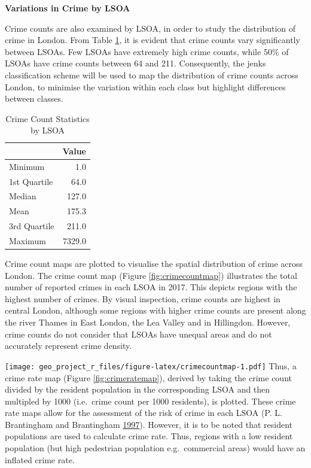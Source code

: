\documentclass[]{article}
\begin{document}
\textbf{Variations in Crime by LSOA}

Crime counts are also examined by LSOA, in order to study the
distribution of crime in London. From Table \ref{tab:LSOAstats}, it is
evident that crime counts vary significantly between LSOAs. Few LSOAs
have extremely high crime counts, while 50\% of LSOAs have crime counts
between 64 and 211. Consequently, the jenks classification scheme will
be used to map the distribution of crime counts across London, to
minimise the variation within each class but highlight differences
between classes.

\begin{table}

\caption{\label{tab:LSOAstats}Crime Count Statistics by LSOA}
\centering
\begin{tabular}[t]{l|r}
\hline
  & Value\\
\hline
Minimum & 1.0\\
\hline
1st Quartile & 64.0\\
\hline
Median & 127.0\\
\hline
Mean & 175.3\\
\hline
3rd Quartile & 211.0\\
\hline
Maximum & 7329.0\\
\hline
\end{tabular}
\end{table}

Crime count maps are plotted to visualise the spatial distribution of
crime across London. The crime count map (Figure
\ref{fig:crimecountmap}) illustrates the total number of reported crimes
in each LSOA in 2017. This depicts regions with the highest number of
crimes. By visual inspection, crime counts are highest in central
London, although some regions with higher crime counts are present along
the river Thames in East London, the Lea Valley and in Hillingdon.
However, crime counts do not consider that LSOAs have unequal areas and
do not accurately represent crime density.

\texttt{[image: geo\_project\_r\_files/figure-latex/crimecountmap-1.pdf]}
Thus, a crime rate map (Figure \ref{fig:crimeratemap}), derived by
taking the crime count divided by the resident population in the
corresponding LSOA and then multipled by 1000 (i.e.~crime count per 1000
residents), is plotted. These crime rate maps allow for the assessment
of the risk of crime in each LSOA (P. L. Brantingham and Brantingham
\protect\hyperlink{ref-Brantingham1997}{1997}). However, it is to be
noted that resident populations are used to calculate crime rate. Thus,
regions with a low resident population (but high pedestrian population
e.g.~commercial areas) would have an inflated crime rate.
\end{document}
